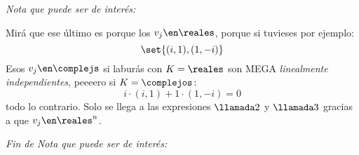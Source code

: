 \begin{itemize}
        \bigskip

        \textit{Nota que puede ser de interés:}

        Mirá que ese último \red{!!} es porque los $v_j \en \reales$, porque si tuvieses por ejemplo:
        $$
          \set{(i,1), (1,-i)}
        $$
        Esos $v_j \en \complejs$ si laburás con $K = \reales$ son {\large{MEGA}} \textit{linealmente independientes},
        peeeero si $K = \complejos$:
        $$
          i \cdot (i, 1) + 1 \cdot (1,-i) = 0
        $$
        todo lo contrario. Solo se llega a las expresiones $\llamada2$ y $\llamada3$ gracias a que $v_j \en \reales^n$.

        \textit{Fin de Nota que puede ser de interés:}
\end{itemize}

\begin{aportes}
  \item {}
\end{aportes}
